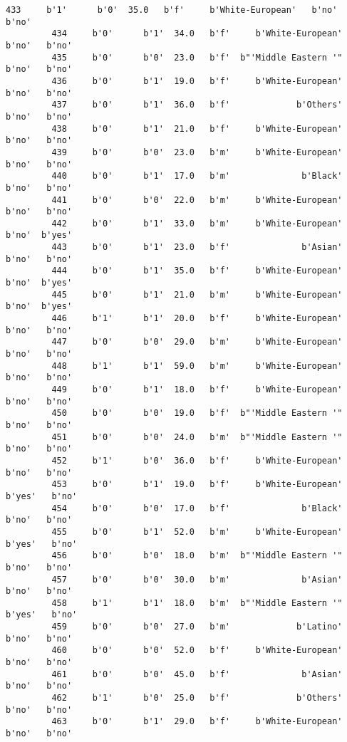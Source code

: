 \documentclass[11pt]{article}
\begin{document}
\begin{Verbatim}[commandchars=\\\{\}]
         433     b'1'      b'0'  35.0   b'f'     b'White-European'   b'no'   b'no'   
         434     b'0'      b'1'  34.0   b'f'     b'White-European'   b'no'   b'no'   
         435     b'0'      b'0'  23.0   b'f'  b"'Middle Eastern '"   b'no'   b'no'   
         436     b'0'      b'1'  19.0   b'f'     b'White-European'   b'no'   b'no'   
         437     b'0'      b'1'  36.0   b'f'             b'Others'   b'no'   b'no'   
         438     b'0'      b'1'  21.0   b'f'     b'White-European'   b'no'   b'no'   
         439     b'0'      b'0'  23.0   b'm'     b'White-European'   b'no'   b'no'   
         440     b'0'      b'1'  17.0   b'm'              b'Black'   b'no'   b'no'   
         441     b'0'      b'0'  22.0   b'm'     b'White-European'   b'no'   b'no'   
         442     b'0'      b'1'  33.0   b'm'     b'White-European'   b'no'  b'yes'   
         443     b'0'      b'1'  23.0   b'f'              b'Asian'   b'no'   b'no'   
         444     b'0'      b'1'  35.0   b'f'     b'White-European'   b'no'  b'yes'   
         445     b'0'      b'1'  21.0   b'm'     b'White-European'   b'no'  b'yes'   
         446     b'1'      b'1'  20.0   b'f'     b'White-European'   b'no'   b'no'   
         447     b'0'      b'0'  29.0   b'm'     b'White-European'   b'no'   b'no'   
         448     b'1'      b'1'  59.0   b'm'     b'White-European'   b'no'   b'no'   
         449     b'0'      b'1'  18.0   b'f'     b'White-European'   b'no'   b'no'   
         450     b'0'      b'0'  19.0   b'f'  b"'Middle Eastern '"   b'no'   b'no'   
         451     b'0'      b'0'  24.0   b'm'  b"'Middle Eastern '"   b'no'   b'no'   
         452     b'1'      b'0'  36.0   b'f'     b'White-European'   b'no'   b'no'   
         453     b'0'      b'1'  19.0   b'f'     b'White-European'  b'yes'   b'no'   
         454     b'0'      b'0'  17.0   b'f'              b'Black'   b'no'   b'no'   
         455     b'0'      b'1'  52.0   b'm'     b'White-European'  b'yes'   b'no'   
         456     b'0'      b'0'  18.0   b'm'  b"'Middle Eastern '"   b'no'   b'no'   
         457     b'0'      b'0'  30.0   b'm'              b'Asian'   b'no'   b'no'   
         458     b'1'      b'1'  18.0   b'm'  b"'Middle Eastern '"  b'yes'   b'no'   
         459     b'0'      b'0'  27.0   b'm'             b'Latino'   b'no'   b'no'   
         460     b'0'      b'0'  52.0   b'f'     b'White-European'   b'no'   b'no'   
         461     b'0'      b'0'  45.0   b'f'              b'Asian'   b'no'   b'no'   
         462     b'1'      b'0'  25.0   b'f'             b'Others'   b'no'   b'no'   
         463     b'0'      b'1'  29.0   b'f'     b'White-European'   b'no'   b'no'   

\end{Verbatim}
\end{document}
